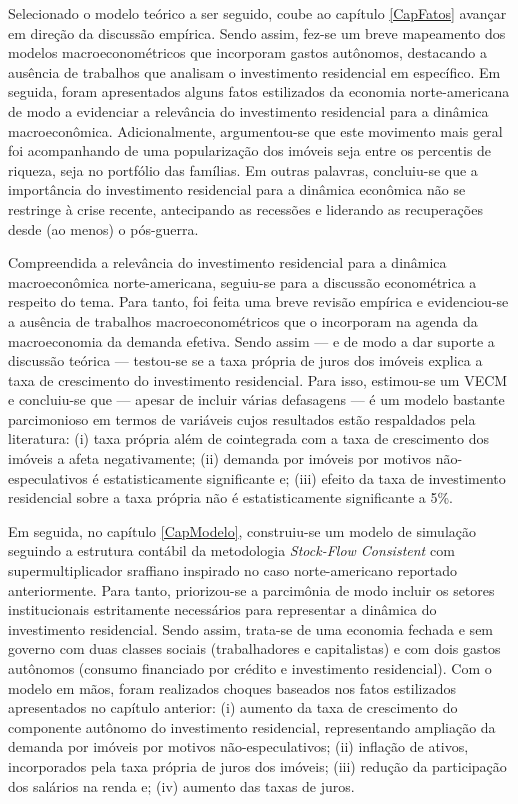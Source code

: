 Selecionado o modelo teórico a ser seguido, coube ao capítulo \ref{CapFatos} avançar em direção da discussão empírica.
Sendo assim, fez-se um breve mapeamento dos modelos macroeconométricos que incorporam gastos autônomos, destacando a ausência de trabalhos que analisam o investimento residencial em específico.
Em seguida, foram apresentados alguns fatos estilizados da economia norte-americana de modo a evidenciar a relevância do investimento residencial para a dinâmica macroeconômica.
Adicionalmente, argumentou-se que este movimento mais geral foi acompanhando de uma popularização dos imóveis seja entre os percentis de riqueza, seja no portfólio das famílias.
Em outras palavras,
concluiu-se que a importância do investimento residencial para a dinâmica econômica não se restringe à crise recente, antecipando as recessões  e liderando as recuperações desde (ao menos) o pós-guerra.


Compreendida a relevância do investimento residencial para a dinâmica macroeconômica norte-americana, seguiu-se para a discussão econométrica a respeito do tema.
Para tanto, foi feita uma breve revisão empírica e evidenciou-se a ausência de trabalhos macroeconométricos que o incorporam na agenda da macroeconomia da demanda efetiva.
Sendo assim --- e de modo a dar suporte a discussão teórica --- testou-se se a taxa própria de juros dos imóveis explica a taxa de crescimento do investimento residencial.
Para isso, estimou-se um VECM  e concluiu-se que --- apesar de incluir várias defasagens --- é um modelo bastante parcimonioso em termos de variáveis cujos resultados estão respaldados pela literatura:
(i) taxa própria além de cointegrada com a taxa de crescimento dos imóveis a afeta negativamente; (ii) demanda por imóveis por motivos não-especulativos é estatisticamente significante e; (iii) efeito da taxa de investimento residencial sobre a taxa própria não é estatisticamente significante a 5\%.


Em seguida, no capítulo \ref{CapModelo}, construiu-se um modelo de simulação seguindo a estrutura contábil da metodologia \textit{Stock-Flow Consistent} com supermultiplicador sraffiano inspirado no caso norte-americano reportado anteriormente.
Para tanto, priorizou-se a parcimônia de modo incluir os setores institucionais estritamente necessários para representar a dinâmica do investimento residencial.
Sendo assim, trata-se de uma economia fechada e sem governo com duas classes sociais (trabalhadores e capitalistas) e com dois gastos autônomos (consumo financiado por crédito e investimento residencial).
Com o modelo em mãos, foram realizados choques baseados nos fatos estilizados apresentados no capítulo anterior: (i) aumento da taxa de crescimento do componente autônomo do investimento residencial, representando ampliação da demanda por imóveis por motivos não-especulativos; (ii) inflação de ativos, incorporados pela taxa própria de juros dos imóveis; (iii) redução da participação dos salários na renda e; (iv) aumento das taxas de juros.


